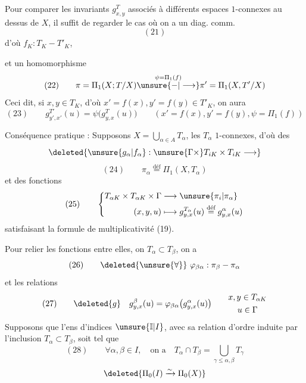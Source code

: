 Pour comparer les invariants $g_{x,y}^T$ associés à différents espaces $1$-connexes au dessus de $X$, il suffit de regarder le cas où on a un diag. comm.
\[
(21)
\]
d'où $f_K:T_K\mathbin{-}T'_K$,

et un homomorphisme
\[
(22)\qquad\pi=\Pi_1(X;T/X)\overset{\psi=\Pi_1(f)}{\unsure{\mathbin{-}|\longrightarrow}}\pi'=\Pi_1(X,T'/X)
\]
Ceci dit, si $x,y\in T_K$, d'où $x'=f(x),y'=f(y)\in T'_K$, on aura
\[
(23)\qquad g_{y',x'}^{T'}(u)=\psi\bigl(g_{y,x}^T(u)\bigr)
\qquad(x'=f(x),y'=f(y),\psi=\Pi_1(f))
\]

Conséquence pratique : Supposons $X=\bigcup_{\alpha\in A}T_\alpha$, les $T_\alpha$ $1$-connexes, d'où des  
\[
\deleted{\unsure{g_\alpha|f_\alpha}:\unsure{\Gamma\times}T_{iK}\times T_{iK}\longrightarrow}
\]
\[
(24)\qquad \pi_\alpha\overset{\text{déf}}{=}\Pi_1(X,T_\alpha)
\]
et des fonctions
\[
(25)\qquad\left\{\begin{aligned}
T_{\alpha K}\times T_{\alpha K}\times\Gamma&\longrightarrow\unsure{\pi_i|\pi_\alpha}\\
(x,y,u)&\longmapsto g_{y,x}^{T_\alpha}(u)\overset{\text{déf}}{=}g_{y,x}^{\alpha}(u)
\end{aligned}\right.
\]
satisfaisant la formule de multiplicativité (19).

Pour relier les fonctions entre elles,  on   $T_\alpha\subset T_\beta$, on a
\[
(26)\qquad\deleted{\unsure{\forall}}\ \varphi_{\beta\alpha}:\pi_\beta\mathbin{-}\pi_\alpha
\]
et les relations
\[
(27)\qquad\deleted{g}\quad g_{y,x}^{\beta}(u)=\varphi_{\beta\alpha}\bigl(g_{y,x}^{\alpha}(u)\bigr)\qquad\begin{gathered}x,y\in T_{\alpha K}\\u\in\Gamma\end{gathered}
\]
Supposons que l'ens d'indices $\unsure{\mathbb{I}|I}$, avec sa relation d'ordre induite par l'inclusion $T_\alpha\subset T_\beta$, soit tel que 
\[
(28)\qquad\forall\alpha,\beta\in I,\quad\text{on a}\quad T_\alpha\cap T_\beta=\bigcup_{\gamma\le\alpha,\beta}T_\gamma
\]
\[
\deleted{\Pi_0(I)\xrightarrow{\sim}\Pi_0(X)}
\]

